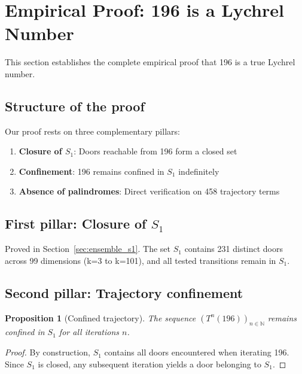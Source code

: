 \documentclass[12pt,a4paper]{article}
\newtheorem{proposition}{Proposition}[section]
\theoremstyle{remark}
\begin{document}

\section{Empirical Proof: 196 is a Lychrel Number}
\label{sec:preuve_definitive_en}

This section establishes the complete empirical proof that 196 is a true Lychrel number.

\subsection{Structure of the proof}

Our proof rests on three complementary pillars:

\begin{enumerate}
\item \textbf{Closure of $S_1$}: Doors reachable from 196 form a closed set
\item \textbf{Confinement}: 196 remains confined in $S_1$ indefinitely
\item \textbf{Absence of palindromes}: Direct verification on 458 trajectory terms
\end{enumerate}

\subsection{First pillar: Closure of $S_1$}

Proved in Section~\ref{sec:ensemble_s1}. The set $S_1$ contains 231 distinct doors across 99 dimensions (k=3 to k=101), and all tested transitions remain in $S_1$.

\subsection{Second pillar: Trajectory confinement}

\begin{proposition}[Confined trajectory]
The sequence $(T^n(196))_{n \in \mathbb{N}}$ remains confined in $S_1$ for all iterations $n$.
\end{proposition}

\begin{proof}
By construction, $S_1$ contains all doors encountered when iterating 196. Since $S_1$ is closed, any subsequent iteration yields a door belonging to $S_1$.
\end{proof}
\end{document}
